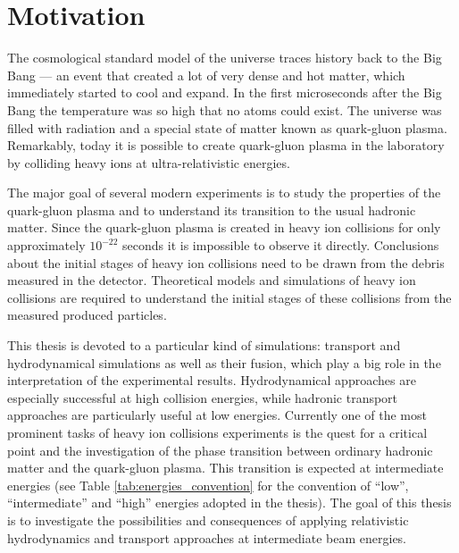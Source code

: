 \chapter{Motivation}
\label{chap:intro}




The cosmological standard model of the universe traces history back to the Big Bang --- an event that created a lot of very dense and hot matter, which
immediately started to cool and expand. In the first microseconds after the Big
Bang the temperature was so high that no atoms could exist. The universe was
filled with radiation and a special state of matter known as quark-gluon plasma.
Remarkably, today it is possible to create quark-gluon plasma in the laboratory by
colliding heavy ions at ultra-relativistic energies.

The major goal of several modern experiments is to study the properties of the
quark-gluon plasma and to understand its transition to the usual hadronic matter.
Since the quark-gluon plasma is created in heavy ion collisions for only
approximately $10^{-22}$ seconds it is impossible to observe it directly.
Conclusions about the initial stages of heavy ion collisions need to be drawn from
the debris measured in the detector. Theoretical models and simulations
of heavy ion collisions are required to understand the initial stages of these
collisions from the measured produced particles.

This thesis is devoted to a particular kind of simulations: transport
and hydrodynamical simulations as well as their fusion, which play a big role in
the interpretation of the experimental results. Hydrodynamical approaches are
especially successful at high collision energies, while hadronic transport approaches
are particularly useful at low energies. Currently one of the most prominent tasks of
heavy ion collisions experiments is the quest for a critical point and the
investigation of the phase transition between ordinary hadronic matter and the
quark-gluon plasma.  This transition is expected at intermediate
energies (see Table \ref{tab:energies_convention} for the convention of ``low'',
``intermediate'' and ``high'' energies adopted in the thesis). The goal of this thesis
is to investigate the possibilities and consequences of applying relativistic
hydrodynamics and transport approaches at intermediate beam energies.

